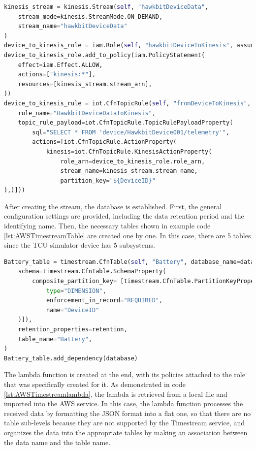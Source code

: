 \begin{lstlisting}[language=Python, caption={CDK code for the creation of the Kinesis stream with its role and rule}, label=lst:AWSKinesis]
kinesis_stream = kinesis.Stream(self, "hawkbitDeviceData",
    stream_mode=kinesis.StreamMode.ON_DEMAND,
    stream_name="hawkbitDeviceData"
)
device_to_kinesis_role = iam.Role(self, "hawkbitDeviceToKinesis", assumed_by=iam.ServicePrincipal("iot.amazonaws.com"),  role_name="hawkbitDeviceToKinesis")
device_to_kinesis_role.add_to_policy(iam.PolicyStatement(
    effect=iam.Effect.ALLOW,
    actions=["kinesis:*"],
    resources=[kinesis_stream.stream_arn],
))
device_to_kinesis_rule = iot.CfnTopicRule(self, "fromDeviceToKinesis",
    rule_name="HawkbitDeviceDataToKinesis",
    topic_rule_payload=iot.CfnTopicRule.TopicRulePayloadProperty(
        sql="SELECT * FROM 'device/HawkbitDevice001/telemetry'",
        actions=[iot.CfnTopicRule.ActionProperty(
            kinesis=iot.CfnTopicRule.KinesisActionProperty(
                role_arn=device_to_kinesis_role.role_arn,
                stream_name=kinesis_stream.stream_name,
                partition_key="${DeviceID}"
),)]))
\end{lstlisting}
After creating the stream, the database is established. First, the general configuration settings are provided, including the data retention period and the identifying name. Then, the necessary tables shown in example code \ref{lst:AWSTimestreamTable} are created one by one. In this case, there are 5 tables since the TCU simulator device has 5 subsystems.
\begin{lstlisting}[language=Python, caption={CDK code for the creation of the Battery table of the Timestream database}, label=lst:AWSTimestreamTable]
Battery_table = timestream.CfnTable(self, "Battery", database_name=database.database_name,
    schema=timestream.CfnTable.SchemaProperty(
        composite_partition_key= [timestream.CfnTable.PartitionKeyProperty(
            type="DIMENSION",
            enforcement_in_record="REQUIRED",
            name="DeviceID"
    )]),
    retention_properties=retention,
    table_name="Battery",
)
Battery_table.add_dependency(database)
\end{lstlisting}
The lambda function is created at the end, with its policies attached to the role that was specifically created for it. As demonstrated in code \ref{lst:AWSTimestreamlambda}, the lambda is retrieved from a local file and imported into the AWS service. In this case, the lambda function processes the received data by formatting the JSON format into a flat one, so that there are no table sub-levels because they are not supported by the Timestream service, and organizes the data into the appropriate tables by making an association between the data name and the table name.
